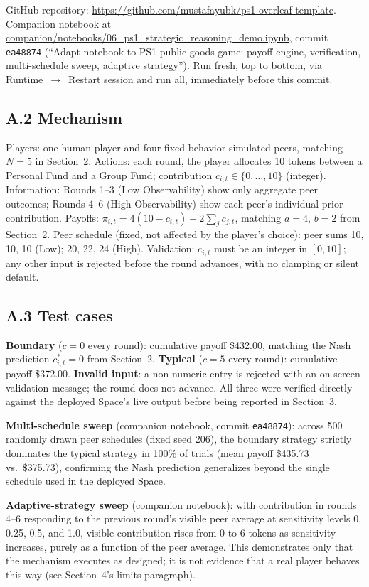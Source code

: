 GitHub repository: \url{https://github.com/mustafayubk/ps1-overleaf-template}. Companion notebook at \url{companion/notebooks/06_ps1_strategic_reasoning_demo.ipynb}, commit \texttt{ea48874} (``Adapt notebook to PS1 public goods game: payoff engine, verification, multi-schedule sweep, adaptive strategy''). Run fresh, top to bottom, via Runtime~$\to$~Restart session and run all, immediately before this commit.

\subsection*{A.2 Mechanism}
Players: one human player and four fixed-behavior simulated peers, matching $N=5$ in Section~2. Actions: each round, the player allocates 10 tokens between a Personal Fund and a Group Fund; contribution $c_{i,t}\in\{0,\dots,10\}$ (integer). Information: Rounds 1--3 (Low Observability) show only aggregate peer outcomes; Rounds 4--6 (High Observability) show each peer's individual prior contribution. Payoffs: $\pi_{i,t}=4(10-c_{i,t})+2\sum_{j}c_{j,t}$, matching $a=4$, $b=2$ from Section~2. Peer schedule (fixed, not affected by the player's choice): peer sums 10, 10, 10 (Low); 20, 22, 24 (High). Validation: $c_{i,t}$ must be an integer in $[0,10]$; any other input is rejected before the round advances, with no clamping or silent default.

\subsection*{A.3 Test cases}
\textbf{Boundary} ($c=0$ every round): cumulative payoff \$432.00, matching the Nash prediction $c_{i,t}^{*}=0$ from Section~2. \textbf{Typical} ($c=5$ every round): cumulative payoff \$372.00. \textbf{Invalid input}: a non-numeric entry is rejected with an on-screen validation message; the round does not advance. All three were verified directly against the deployed Space's live output before being reported in Section~3.

\textbf{Multi-schedule sweep} (companion notebook, commit \texttt{ea48874}): across 500 randomly drawn peer schedules (fixed seed 206), the boundary strategy strictly dominates the typical strategy in 100\% of trials (mean payoff \$435.73 vs.\ \$375.73), confirming the Nash prediction generalizes beyond the single schedule used in the deployed Space.

\textbf{Adaptive-strategy sweep} (companion notebook): with contribution in rounds 4--6 responding to the previous round's visible peer average at sensitivity levels 0, 0.25, 0.5, and 1.0, visible contribution rises from 0 to 6 tokens as sensitivity increases, purely as a function of the peer average. This demonstrates only that the mechanism executes as designed; it is not evidence that a real player behaves this way (see Section~4's limits paragraph).

